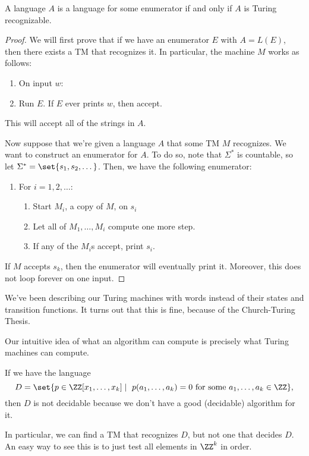\documentclass{standalone}
\begin{document}
\begin{proposition}
	A language \(A\) is a language for some enumerator
  if and only if \(A\) is Turing recognizable.
\end{proposition}
\begin{proof}
	We will first prove that if we have an enumerator \(E\) with \(A = L(E)\),
  then there exists a \textsf{TM} that recognizes it.
  In particular, the machine \(M\) works as follows:
	\begin{enumerate}[nosep, start=0]
		\item On input \(w\):
		\item Run \(E\). If \(E\) ever prints \(w\), then accept.
	\end{enumerate}
	This will accept all of the strings in \(A\).

	Now suppose that we're given a language \(A\)
  that some \textsf{TM} \(M\) recognizes.
  We want to construct an enumerator for \(A\).
  To do so, note that \(\Sigma^*\) is countable,
  so let \(\Sigma^* = \set{s_1, s_2, \dots}\).
  Then, we have the following enumerator:
	\begin{enumerate}[nosep]
		\item For \(i = 1, 2, \dots\):
		\begin{enumerate}[nosep]
			\item Start \(M_i\), a copy of \(M\), on \(s_i\)
			\item Let all of \(M_1, \dots, M_i\) compute one more step.
			\item If any of the \(M_i\)s accept, print \(s_i\).
		\end{enumerate}
	\end{enumerate}
	If \(M\) accepts \(s_k\), then the enumerator will eventually print it. Moreover, this does not loop forever on one input.
\end{proof}

We've been describing our Turing machines with words
instead of their states and transition functions.
It turns out that this is fine, because of the Church-Turing Thesis.
\begin{claim}
	Our intuitive idea of what an algorithm can compute
  is precisely what Turing machines can compute.
\end{claim}

\begin{example}
	If we have the language
	\[
		D = \set{
      p \in \ZZ[x_1, \dotsc, x_k] \mid
      \text{
        \(p(a_1, \dotsc, a_k) = 0\) for some \(a_1, \dotsc, a_k \in \ZZ\)}
      },
	\]
	then \(D\) is not decidable because we don't have
  a good (decidable) algorithm for it.
\end{example}
In particular, we can find a \textsf{TM} that recognizes \(D\),
but not one that decides \(D\).
An easy way to see this is to just test all elements in \(\ZZ^k\) in order.
\end{document}
